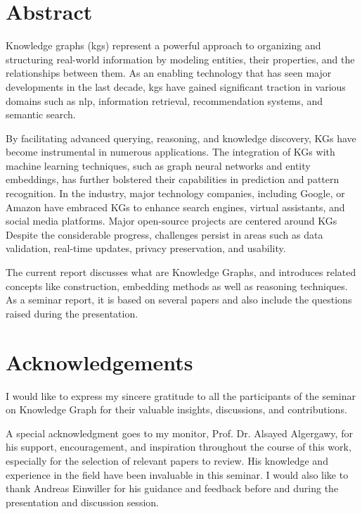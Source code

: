 \documentclass[11pt]{article} %
\title{\thetitle}
\author{\theauthor}
\date{April-Mai 2023}
\begin{document}

\newpage


\section*{Abstract}
Knowledge graphs (\acrshort{kg}s) represent a powerful approach to organizing and structuring real-world information by modeling entities, their properties, and the relationships between them. As an enabling technology that has seen major developments in the last decade, \acrshort{kg}s have gained significant traction in various domains such as \acrshort{nlp}, information retrieval, recommendation systems, and semantic search.

By facilitating advanced querying, reasoning, and knowledge discovery, KGs have become instrumental in numerous applications. The integration of KGs with machine learning techniques, such as graph neural networks and entity embeddings, has further bolstered their capabilities in prediction and pattern recognition. In the industry, major technology companies, including Google, or Amazon have embraced KGs to enhance search engines, virtual assistants, and social media platforms. Major open-source projects are centered around KGs  Despite the considerable progress, challenges persist in areas such as data validation, real-time updates, privacy preservation, and usability. 

The current report discusses what are Knowledge Graphs, and introduces related concepts like construction, embedding methods as well as reasoning techniques. As a seminar report, it is based on several papers and also include the questions raised during the presentation.  

\section*{Acknowledgements}
I would like to express my sincere gratitude to all the participants of the seminar on Knowledge Graph for their valuable insights, discussions, and contributions. 

A special acknowledgment goes to my monitor, Prof. Dr. Alsayed Algergawy, for his support, encouragement, and inspiration throughout the course of this work, especially for the selection of relevant papers to review. His knowledge and experience in the field have been invaluable in this seminar. I would also like to thank Andreas Einwiller for his guidance and feedback before and during the presentation and discussion session.
\end{document}
